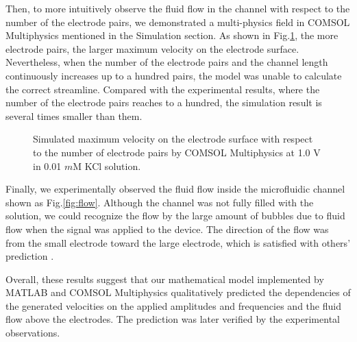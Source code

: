 \documentclass[journal,svgnames,twocolumn,x11names]{IEEEtran}
\begin{document}
Then, to more intuitively observe the fluid flow in the channel with respect to the number of the electrode pairs, we demonstrated a multi-physics field in COMSOL Multiphysics mentioned in the Simulation section. As shown in Fig.\ref{fig:COMSOL_simu}, the more electrode pairs, the larger maximum velocity on the electrode surface. Nevertheless, when the number of the electrode pairs and the channel length continuously increases up to a hundred pairs, the model was unable to calculate the correct streamline. Compared with the experimental results\cite{Stone2004}\cite{Ribetto2012}, where the number of the electrode pairs reaches to a hundred, the simulation result is several times smaller than them.
\begin{figure}[htp]
    \centering
    \setlength{\abovecaptionskip}{-0.2cm}
    
    \caption{Simulated maximum velocity on the electrode surface with respect to the number of electrode pairs by COMSOL Multiphysics at 1.0 $\mathrm{V}$ in 0.01 $m$M KCl solution.}
    \label{fig:COMSOL_simu}
    \vspace{-0.2cm}
\end{figure}
Finally, we experimentally observed the fluid flow inside the microfluidic channel shown as Fig.\ref{fig:flow}. Although the channel was not fully filled with the solution, we could recognize the flow by the large amount of bubbles due to fluid flow when the signal was applied to the device. The direction of the flow was from the small electrode toward the large electrode, which is satisfied with others' prediction \cite{ramos2003}.

Overall, these results suggest that our mathematical model implemented by MATLAB and COMSOL Multiphysics qualitatively predicted the dependencies of the generated velocities on the applied amplitudes and frequencies and the fluid flow above the electrodes. The prediction was later verified by the experimental observations.
\end{document}
